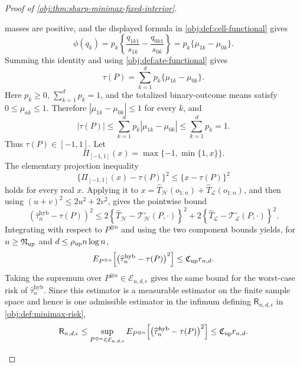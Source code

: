\begin{proof}[Proof of \cref{obj:thm:sharp-minimax-fixed-interior}]
\begin{enumerate}
masses are positive, and the displayed formula in \cref{obj:def:cell-functional} gives
\[
\phi(q_k)
=
p_k\left\{\frac{q_{1k1}}{s_{1k}}-\frac{q_{0k1}}{s_{0k}}\right\}
=
p_k\{\mu_{1k}-\mu_{0k}\}.
\]
Summing this identity and using \cref{obj:def:ate-functional} gives
\[
\tau(P)=\sum_{k=1}^d p_k\{\mu_{1k}-\mu_{0k}\}.
\]
Here \(p_k\ge0\), \(\sum_{k=1}^d p_k=1\), and the totalized binary-outcome means satisfy
\(0\le\mu_{ak}\le1\).  Therefore \(|\mu_{1k}-\mu_{0k}|\le1\) for every \(k\), and
\[
|\tau(P)|
\le
\sum_{k=1}^d p_k |\mu_{1k}-\mu_{0k}|
\le
\sum_{k=1}^d p_k
=1.
\]
Thus \(\tau(P)\in[-1,1]\).  Let
\[
\Pi_{[-1,1]}(x)=\max\{-1,\min\{1,x\}\}.
\]
The elementary projection inequality
\[
\{\Pi_{[-1,1]}(x)-\tau(P)\}^2\le \{x-\tau(P)\}^2
\]
holds for every real \(x\).  Applying it to
\(x=\widehat T_{\mathcal H}(o_{1:n})+\widehat T_{\mathcal L}(o_{1:n})\), and then using
\((u+v)^2\le2u^2+2v^2\), gives the pointwise bound
\[
\left(\widehat\tau_n^{\mathrm{hyb}}-\tau(P)\right)^2
\le
2\left\{\widehat T_{\mathcal H}-\mathcal T_{\mathcal H}^{\circ}(P,\cdot)\right\}^2
+
2\left\{\widehat T_{\mathcal L}-\mathcal T_{\mathcal L}^{\circ}(P,\cdot)\right\}^2 .
\]
Integrating with respect to \(P^{\otimes n}\) and using the two component bounds yields, for
\(n\ge\mathfrak N_{\rm up}\) and
\(d\le\mathfrak\rho_{\rm up}n\log n\),
\[
E_{P^{\otimes n}}\!\left[
\left(\widehat\tau_n^{\mathrm{hyb}}-\tau(P)\right)^2
\right]
\le
\mathfrak C_{\rm up} r_{n,d}.
\]
Taking the supremum over \(P^{\otimes n}\in\mathcal E_{n,d,\epsilon}\) gives the same bound
for the worst-case risk of \(\widehat\tau_n^{\mathrm{hyb}}\).  Since this estimator is a
measurable estimator on the finite sample space and hence is one admissible estimator in the
infimum defining \(\mathsf R_{n,d,\epsilon}\) in \cref{obj:def:minimax-risk},
\[
\mathsf R_{n,d,\epsilon}
\le
\sup_{P^{\otimes n}\in\mathcal E_{n,d,\epsilon}}
E_{P^{\otimes n}}\!\left[
\left(\widehat\tau_n^{\mathrm{hyb}}-\tau(P)\right)^2
\right]
\le
\mathfrak C_{\rm up} r_{n,d}.
\]


\end{enumerate}
\end{proof}
